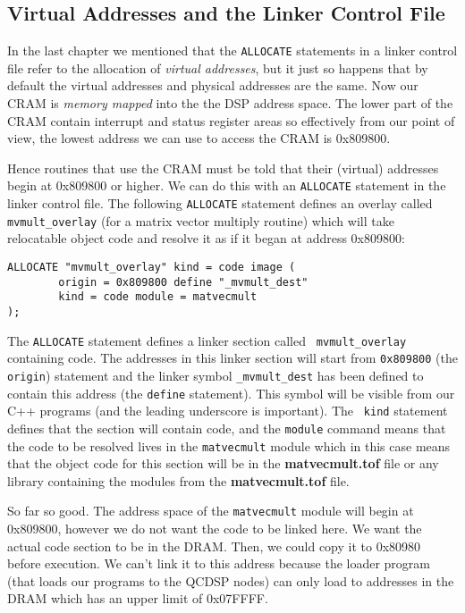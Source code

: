 \subsection{Virtual Addresses and the Linker Control File}\label{s:ModLCF}
In the last chapter we mentioned that the {\tt ALLOCATE} statements in 
a linker control file refer to the allocation of {\em virtual addresses}, 
but it just so happens that by default the virtual addresses and physical
addresses are the same. Now our CRAM is {\em memory mapped} into the 
the DSP address space. The lower part  of the CRAM contain interrupt
and status register areas so effectively from our point of view, the 
lowest address we can use to access the CRAM is 0x809800.

Hence routines that use the CRAM must be told that their (virtual) addresses
begin at 0x809800 or higher. We can do this with an {\tt ALLOCATE}
statement in the linker control file. The following {\tt ALLOCATE} statement
defines an overlay called {\tt mvmult\_overlay} (for a matrix vector multiply
routine) which will take relocatable object code and resolve it as if it
began at address 0x809800:
\begin{verbatim}
ALLOCATE "mvmult_overlay" kind = code image (
        origin = 0x809800 define "_mvmult_dest"
        kind = code module = matvecmult
);
\end{verbatim}

The {\tt ALLOCATE} statement defines a linker section called {\tt
mvmult\_overlay} containing code. The addresses in this linker section
will start from {\tt 0x809800} (the {\tt origin}) statement and the
linker symbol {\tt \_mvmult\_dest} has been defined to contain this
address (the {\tt define} statement). This symbol will be visible from
our C++ programs (and the leading underscore is important). The {\tt
kind} statement defines that the section will contain code, and the
{\tt module} command means that the code to be resolved lives in the
{\tt matvecmult} module which in this case means that the object code
for this section will be in the {\bf matvecmult.tof} file or any
library containing the modules from the {\bf matvecmult.tof} file.

So far so good. The address space of the {\tt matvecmult} module will
begin at 0x809800, however we do not want the code to be linked here.
We want the actual code section to be in the DRAM. Then, we could
copy it to 0x80980 before execution. We can't link it to this address
because the loader program (that loads our programs to the QCDSP nodes)
can only load to addresses in the DRAM which has an upper limit of 0x07FFFF.

